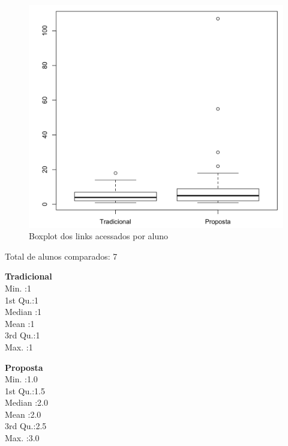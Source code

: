 \begin{figure}[htb]
  \caption{\label{fig:uso-sr-boxplot}Boxplot dos links acessados por aluno}
  \begin{center}
      \includegraphics[scale=0.4]{./Figuras/uso-sr-boxplot.png}
  \end{center}
\end{figure}

Total de alunos comparados: 7

\begin{multicols}{2}

\noindent\textbf{Tradicional}\\
Min.   :1\\
1st Qu.:1\\
Median :1\\
Mean   :1\\
3rd Qu.:1\\
Max.   :1\\

\columnbreak

\noindent\textbf{Proposta}\\
Min.   :1.0\\
1st Qu.:1.5\\
Median :2.0\\
Mean   :2.0\\
3rd Qu.:2.5\\
Max.   :3.0
\end{multicols}

